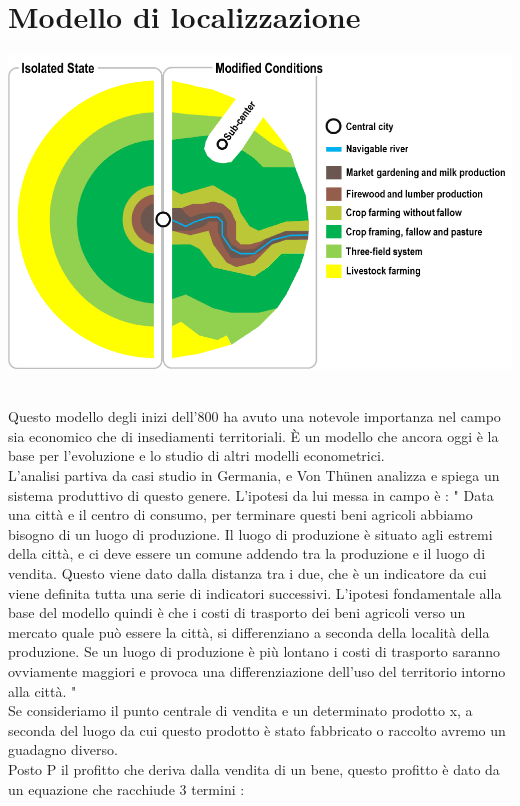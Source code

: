 \documentclass[a4paper,12pt, oneside]{book}
\begin{document}
  \section{Modello di localizzazione}
  \begin{center}
  	\includegraphics[width=0.8\linewidth]{"immagini/von_thunen_model"}
  	\label{fig:von_thunen_model}
  \end{center}
  \leavevmode\\
  Questo modello degli inizi dell'800 ha avuto una notevole importanza nel campo sia economico che di insediamenti territoriali. È un modello che ancora oggi è la base per l'evoluzione e lo studio di altri modelli econometrici.\\
  L'analisi partiva da casi studio in Germania, e Von Thünen analizza e spiega un sistema produttivo di questo genere. L'ipotesi da lui messa in campo è : " Data una città e il centro di consumo, per terminare questi beni agricoli abbiamo bisogno di un luogo di produzione. Il luogo di produzione è situato agli estremi della città, e ci deve essere un comune addendo tra la produzione e il luogo di vendita. Questo viene dato dalla distanza tra i due, che è un indicatore da cui viene definita tutta una serie di indicatori successivi. L'ipotesi fondamentale alla base del modello quindi è che i costi di trasporto dei beni agricoli verso un mercato quale può essere la città, si differenziano a seconda della località della produzione. Se un luogo di produzione è più lontano i costi di trasporto saranno ovviamente maggiori e provoca una differenziazione dell'uso del territorio intorno alla città. "\\
  Se consideriamo il punto centrale di vendita e un determinato prodotto x, a seconda del luogo da cui questo prodotto è stato fabbricato o raccolto avremo un guadagno diverso.\\
  Posto P il profitto che deriva dalla vendita di un bene, questo profitto è dato da un equazione che racchiude 3 termini : 
\end{document}
